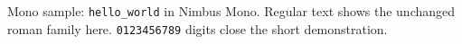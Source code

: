 \documentclass{article}
\begin{document}
Mono sample: \texttt{hello\_world} in Nimbus Mono.
Regular text shows the unchanged roman family here.
\texttt{0123456789} digits close the short demonstration.
\end{document}
